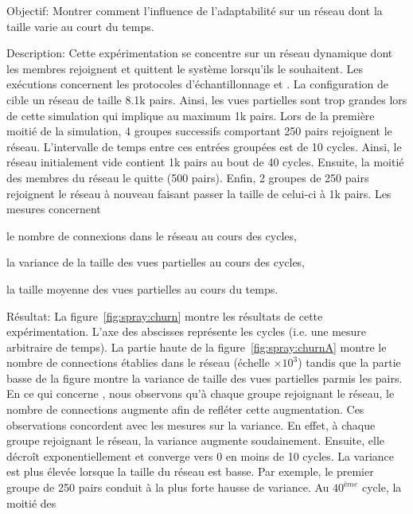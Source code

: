 \begin{asparadesc}
\item [Objectif:] Montrer comment l'influence de l'adaptabilité sur un réseau
  dont la taille varie au court du temps.
\item [Description:] Cette expérimentation se concentre sur un réseau dynamique
  dont les membres rejoignent et quittent le système lorsqu'ils le
  souhaitent. Les exécutions concernent les protocoles d'échantillonnage \CYCLON
  et \SPRAY. La configuration de \CYCLON cible un réseau de taille 8.1k
  pairs. Ainsi, les vues partielles sont trop grandes lors de cette simulation
  qui implique au maximum 1k pairs. Lors de la première moitié de la simulation,
  4 groupes successifs comportant 250 pairs rejoignent le réseau. L'intervalle
  de temps entre ces entrées groupées est de 10 cycles. Ainsi, le réseau
  initialement vide contient 1k pairs au bout de 40 cycles. Ensuite, la moitié
  des membres du réseau le quitte (500 pairs). Enfin, 2 groupes de 250 pairs
  rejoignent le réseau à nouveau faisant passer la taille de celui-ci à 1k
  pairs. Les mesures concernent
  \begin{inparaenum}[(i)]
  \item le nombre de connexions dans le réseau au cours des cycles,
  \item la variance de la taille des vues partielles au cours des cycles,
  \item la taille moyenne des vues partielles au cours du temps.
  \end{inparaenum}
\item [Résultat:] La figure~\ref{fig:spray:churn} montre les résultats de cette
  expérimentation. L'axe des abscisses représente les cycles (i.e. une mesure
  arbitraire de temps). La partie haute de la figure~\ref{fig:spray:churnA}
  montre le nombre de connections établies dans le réseau (échelle
  $\times 10^3$) tandis que la partie basse de la figure montre la variance de
  taille des vues partielles parmis les pairs. En ce qui concerne \SPRAY, nous
  observons qu'à chaque groupe rejoignant le réseau, le nombre de connections
  augmente afin de refléter cette augmentation. Ces observations concordent avec
  les mesures sur la variance. En effet, à chaque groupe rejoignant le réseau,
  la variance augmente soudainement. Ensuite, elle décroît exponentiellement et
  converge vers 0 en moins de 10 cycles. La variance est plus élevée lorsque la
  taille du réseau est basse. Par exemple, le premier groupe de 250 pairs
  conduit à la plus forte hausse de variance. Au $40^{ème}$ cycle, la moitié des

\end{asparadesc}
